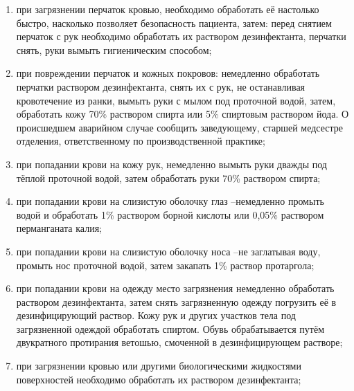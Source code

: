 \documentclass[a4paper,12pt]{extarticle}
\begin{document}
\begin{enumerate}
\begin{enumerate}
\item при загрязнении перчаток кровью, необходимо обработать её настолько быстро, насколько позволяет безопасность пациента, затем: перед снятием перчаток с рук необходимо обработать их раствором дезинфектанта, перчатки снять, руки вымыть гигиеническим способом;
\item при повреждении перчаток и кожных покровов: немедленно обработать перчатки раствором дезинфектанта, снять их с рук, не останавливая кровотечение из ранки, вымыть  руки  с  мылом  под  проточной  водой,  затем,  обработать  кожу  70\% раствором спирта или 5\% спиртовым раствором йода. О происшедшем аварийном случае сообщить заведующему, старшей медсестре отделения, ответственному по производственной практике;
\item при попадании крови на кожу рук, немедленно вымыть руки дважды под тёплой проточной водой, затем обработать руки 70\% раствором спирта;
\item при попадании крови на слизистую оболочку глаз –немедленно промыть водой и обработать  1\%  раствором  борной  кислоты  или    0,05\%  раствором  перманганата калия;
\item при попадании крови на слизистую оболочку носа –не заглатывая воду, промыть нос проточной водой, затем закапать 1\% раствор протаргола;
\item при  попадании  крови  на  одежду  место  загрязнения  немедленно  обработать раствором  дезинфектанта,  затем  снять  загрязненную  одежду    погрузить  её  в дезинфицирующий раствор. Кожу рук и других участков тела под загрязненной одеждой  обработать  спиртом.  Обувь  обрабатывается  путём  двукратного протирания ветошью, смоченной в дезинфицирующем растворе;
\item при загрязнении кровью или другими биологическими жидкостями поверхностей необходимо обработать их раствором дезинфектанта;

\end{enumerate}
\end{enumerate}
\end{document}
